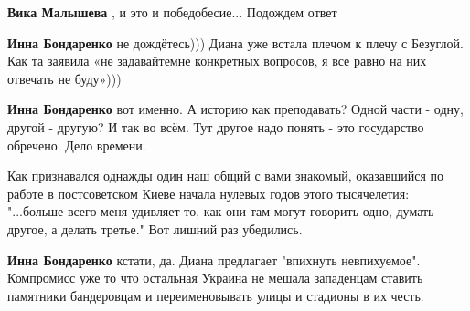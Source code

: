\begin{itemize}
\begin{itemize}
 
\textbf{Вика Малышева} , и это и победобесие... Подождем ответ

 
\textbf{Инна Бондаренко} не дождётесь))) Диана уже встала плечом к плечу с
Безуглой. Как та заявила «не задавайтемне конкретных вопросов, я все равно на
них отвечать не буду»)))

 
\textbf{Инна Бондаренко} вот именно. А историю как преподавать? Одной части -
одну, другой - другую? И так во всём. Тут другое надо понять - это государство
обречено. Дело времени.

 

Как признавался однажды один наш общий с вами знакомый, оказавшийся по работе в
постсоветском Киеве начала нулевых годов этого тысячелетия: "...больше всего
меня удивляет то, как они там могут говорить одно, думать другое, а делать
третье." Вот лишний раз убедились.


 
\textbf{Инна Бондаренко} кстати, да. Диана предлагает "впихнуть невпихуемое".
Компромисс уже то что остальная Украина не мешала западенцам ставить памятники
бандеровцам и переименовывать улицы и стадионы в их честь.


\end{itemize}
\end{itemize}
